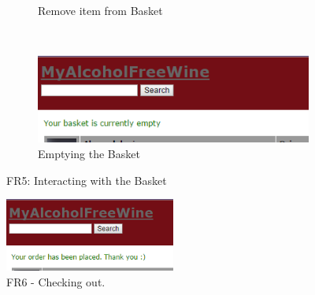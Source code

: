 \documentclass[12pt]{article}
\begin{document}
\begin{figure}[H]
\begin{subfigure}[b]{0.3\textwidth}
        \caption{Remove item from Basket}
        \label{fig:FR5 Remove item from Basket}
    \end{subfigure}
    ~ %
    \begin{subfigure}[b]{0.3\textwidth}
        \includegraphics[width=\textwidth]{assets/FR5_screen_3}
        \caption{Emptying the Basket}
        \label{fig:FR5 empty basket}
    \end{subfigure}
    \caption{FR5: Interacting with the Basket}\label{fig:FR5 Basket}
\end{figure}

\begin{figure}[H]
     
                \includegraphics[width=0.5\textwidth]{assets/FR6_screen1}
                \caption{FR6 - Checking out.}
                \label{fig: FR6_1.} 
\end{figure}
\end{document}
